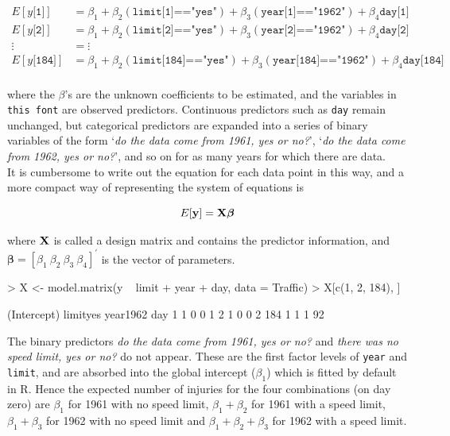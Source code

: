\documentclass{article}
\begin{document}
\begin{displaymath}
\begin{array}{cl}
E[y\texttt{[1]}] &=\beta_{1}+\beta_{2}(\texttt{limit[1]=="yes"})+\beta_{3}(\texttt{year[1]=="1962"})+\beta_{4}\texttt{day[1]}\\
E[y\texttt{[2]}] &= \beta_{1}+\beta_{2}(\texttt{limit[2]=="yes"})+\beta_{3}(\texttt{year[2]=="1962"})+\beta_{4}\texttt{day[2]}\\
\vdots&=\vdots\\
E[y\texttt{[184]}] &= \beta_{1}+\beta_{2}(\texttt{limit[184]=="yes"})+\beta_{3}(\texttt{year[184]=="1962"})+\beta_{4}\texttt{day[184]}\\
\end{array}
\label{SE-eq}
\end{displaymath}

where the $\beta$'s are the unknown coefficients to be estimated, and the variables in \texttt{this font} are observed predictors. Continuous predictors such as \texttt{day} remain unchanged, but categorical predictors are expanded into a series of binary variables of the form `\emph{do the data come from 1961, yes or no?}', `\emph{do the data come from 1962, yes or no?}', and so on for as many years for which there are data.\\ 

It is cumbersome to write out the equation for each data point in this way, and a more compact way of representing the system of equations is

\begin{equation}
E[{\bf y}] = {\bf X}{\bm \beta}
\label{lm-eq}
\end{equation}	

where ${\bf X}$ is called a design matrix and contains the predictor information, and ${\bm \beta} = [\beta_{1}\ \beta_{2}\ \beta_{3}\ \beta_{4}]^{'}$ is the vector of parameters. 

\begin{Schunk}
\begin{Sinput}
> X <- model.matrix(y ~ limit + year + day, data = Traffic)
> X[c(1, 2, 184), ]
\end{Sinput}
\begin{Soutput}
    (Intercept) limityes year1962 day
1             1        0        0   1
2             1        0        0   2
184           1        1        1  92
\end{Soutput}
\end{Schunk}

The binary predictors \emph{do the data come from 1961, yes or no?} and \emph{there was no speed limit, yes or no?} do not appear. These are the first factor levels of \texttt{year} and \texttt{limit}, and are absorbed into the global intercept ($\beta_{1}$) which is fitted by default in R.  Hence the expected number of injuries for the four combinations (on day zero) are $\beta_{1}$ for 1961 with no speed limit, $\beta_{1}+\beta_{2}$ for 1961 with a speed limit, $\beta_{1}+\beta_{3}$ for 1962 with no speed limit and  $\beta_{1}+\beta_{2}+\beta_{3}$ for 1962 with a speed limit.\\
\end{document}
